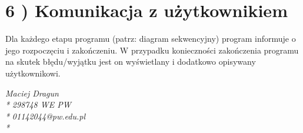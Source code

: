 \documentclass[]{article}
\begin{document}
    \section{6 ) Komunikacja z użytkownikiem}

    Dla każdego etapu programu (patrz: diagram sekwencyjny) program
    informuje o jego rozpoczęciu i zakończeniu. W przypadku konieczności
    zakończenia programu na skutek błędu/wyjątku jest on wyświetlany i
    dodatkowo opisywany użytkownikowi.

    \begin{flushright}
        \emph{Maciej Dragun\\*}
        \emph{298748 WE PW\\*}
        \emph{01142044@pw.edu.pl\\*}
    \end{flushright}
\end{document}
